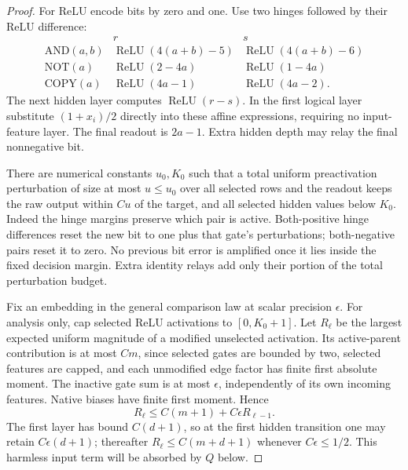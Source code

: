 \begin{proof}
For ReLU encode bits by zero and one. Use two hinges followed by their ReLU difference:
\[
 \begin{array}{c|c|c}
 &r&s\\ \hline
 \mathrm{AND}(a,b)&\operatorname{ReLU}(4(a+b)-5)&
                    \operatorname{ReLU}(4(a+b)-6)\\
 \mathrm{NOT}(a)&\operatorname{ReLU}(2-4a)&
                    \operatorname{ReLU}(1-4a)\\
 \mathrm{COPY}(a)&\operatorname{ReLU}(4a-1)&
                    \operatorname{ReLU}(4a-2).
 \end{array}
\]
The next hidden layer computes $\operatorname{ReLU}(r-s)$. In the first logical layer substitute $(1+x_i)/2$ directly into these affine expressions, requiring no input-feature layer. The final readout is $2a-1$. Extra hidden depth may relay the final nonnegative bit.

There are numerical constants $u_0,K_0$ such that a total uniform preactivation perturbation of size at most $u\le u_0$ over all selected rows and the readout keeps the raw output within $C u$ of the target, and all selected hidden values below $K_0$. Indeed the hinge margins preserve which pair is active. Both-positive hinge differences reset the new bit to one plus that gate's perturbations; both-negative pairs reset it to zero. No previous bit error is amplified once it lies inside the fixed decision margin. Extra identity relays add only their portion of the total perturbation budget.

Fix an embedding in the general comparison law at scalar precision $\epsilon$. For analysis only, cap selected ReLU activations to $[0,K_0+1]$. Let $R_\ell$ be the largest expected uniform magnitude of a modified unselected activation. Its active-parent contribution is at most $C m$, since selected gates are bounded by two, selected features are capped, and each unmodified edge factor has finite first absolute moment. The inactive gate sum is at most $\epsilon$, independently of its own incoming features. Native biases have finite first moment. Hence
\[
 R_\ell\le C(m+1)+C\epsilon R_{\ell-1}.
\]
The first layer has bound $C(d+1)$, so at the first hidden transition one may retain $C\epsilon(d+1)$; thereafter $R_\ell\le C(m+d+1)$ whenever $C\epsilon\le1/2$. This harmless input term will be absorbed by $Q$ below.


\end{proof}
